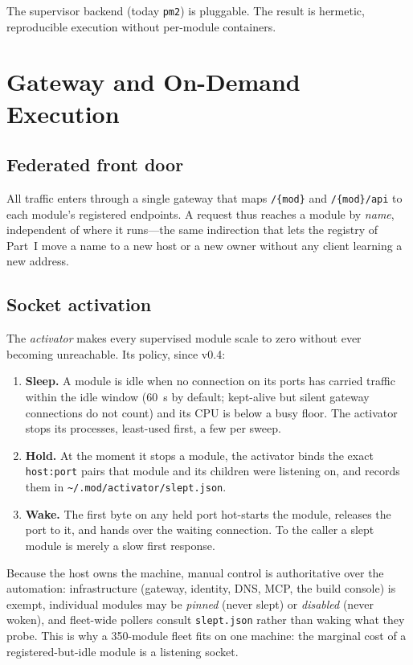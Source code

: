 \documentclass[11pt,a4paper]{article}
\begin{document}
The supervisor backend (today \texttt{pm2}) is pluggable. The result is
hermetic, reproducible execution without per-module containers.

\section{Gateway and On-Demand Execution}

\subsection{Federated front door}

All traffic enters through a single gateway that maps \texttt{/\{mod\}} and
\texttt{/\{mod\}/api} to each module's registered endpoints. A request thus
reaches a module by \emph{name}, independent of where it runs---the same
indirection that lets the registry of Part~I move a name to a new host or a new
owner without any client learning a new address.

\subsection{Socket activation}
\label{sec:activation}

The \emph{activator} makes every supervised module scale to zero without ever
becoming unreachable. Its policy, since v0.4:

\begin{enumerate}
    \item \textbf{Sleep.} A module is idle when no connection on its ports has
    carried traffic within the idle window (60~s by default; kept-alive but
    silent gateway connections do not count) and its CPU is below a busy
    floor. The activator stops its processes, least-used first, a few per
    sweep.
    \item \textbf{Hold.} At the moment it stops a module, the activator binds
    the exact \texttt{host:port} pairs that module and its children were
    listening on, and records them in \texttt{\textasciitilde/.mod/activator/slept.json}.
    \item \textbf{Wake.} The first byte on any held port hot-starts the
    module, releases the port to it, and hands over the waiting connection.
    To the caller a slept module is merely a slow first response.
\end{enumerate}

Because the host owns the machine, manual control is authoritative over the
automation: infrastructure (gateway, identity, DNS, MCP, the build console) is
exempt, individual modules may be \emph{pinned} (never slept) or
\emph{disabled} (never woken), and fleet-wide pollers consult
\texttt{slept.json} rather than waking what they probe. This is why a
350-module fleet fits on one machine: the marginal cost of a
registered-but-idle module is a listening socket.
\end{document}
